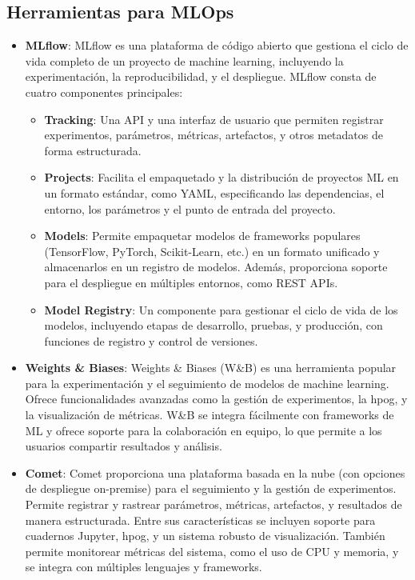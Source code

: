 \subsection{Herramientas para MLOps}
\begin{itemize}
    \item \textbf{MLflow}: MLflow es una plataforma de código abierto que gestiona el ciclo de vida completo de un proyecto de machine learning, incluyendo la experimentación, la reproducibilidad, y el despliegue. MLflow consta de cuatro componentes principales:
          \begin{itemize}
              \item \textbf{Tracking}: Una API y una interfaz de usuario que permiten registrar experimentos, parámetros, métricas, artefactos, y otros metadatos de forma estructurada.
              \item \textbf{Projects}: Facilita el empaquetado y la distribución de proyectos ML en un formato estándar, como YAML, especificando las dependencias, el entorno, los parámetros y el punto de entrada del proyecto.
              \item \textbf{Models}: Permite empaquetar modelos de frameworks populares (TensorFlow, PyTorch, Scikit-Learn, etc.) en un formato unificado y almacenarlos en un registro de modelos. Además, proporciona soporte para el despliegue en múltiples entornos, como REST APIs.
              \item \textbf{Model Registry}: Un componente para gestionar el ciclo de vida de los modelos, incluyendo etapas de desarrollo, pruebas, y producción, con funciones de registro y control de versiones.
          \end{itemize}
    \item \textbf{Weights \& Biases}: Weights \& Biases (W\&B) es una herramienta popular para la experimentación y el seguimiento de modelos de machine learning. Ofrece funcionalidades avanzadas como la gestión de experimentos, la \gls{hpog}, y la visualización de métricas. W\&B se integra fácilmente con frameworks de ML y ofrece soporte para la colaboración en equipo, lo que permite a los usuarios compartir resultados y análisis.

    \item \textbf{Comet}: Comet proporciona una plataforma basada en la nube (con opciones de despliegue on-premise) para el seguimiento y la gestión de experimentos. Permite registrar y rastrear parámetros, métricas, artefactos, y resultados de manera estructurada. Entre sus características se incluyen soporte para cuadernos Jupyter, \gls{hpog}, y un sistema robusto de visualización. También permite monitorear métricas del sistema, como el uso de CPU y memoria, y se integra con múltiples lenguajes y frameworks.


\end{itemize}
